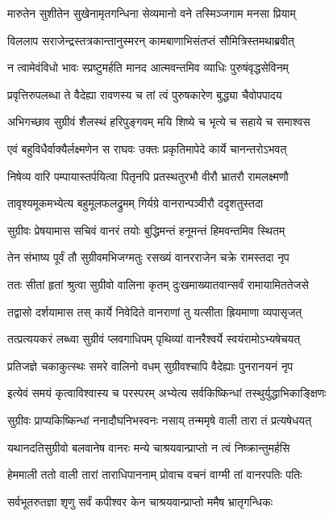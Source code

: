 \twolineshloka
{मारुतेन सुशीतेन सुखेनामृतगन्धिना}
{सेव्यमानो वने तस्मिञ्जगाम मनसा प्रियाम्}


\twolineshloka
{विललाप सराजेन्द्रस्तत्रकान्तानुस्मरन्}
{कामबाणाभिसंतप्तं सौमित्रिस्तमथाब्रवीत्}


\twolineshloka
{न त्वामेवंविधो भावः स्प्रष्टुमर्हति मानद}
{आत्मवन्तमिव व्याधिः पुरुषंवृद्धसेविनम्}


\twolineshloka
{प्रवृत्तिरुपलब्धा ते वैदेह्या रावणस्य च}
{तां त्वं पुरुषकारेण बुद्ध्या चैवोपपादय}


\twolineshloka
{अभिगच्छाव सुग्रीवं शैलस्थं हरिपुङ्गवम्}
{मयि शिष्ये च भृत्ये च सहाये च समाश्वस}


\twolineshloka
{एवं बहुविधैर्वाक्यैर्लक्ष्मणेन स राघवः}
{उक्तः प्रकृतिमापेदे कार्ये चानन्तरोऽभवत्}


\twolineshloka
{निषेव्य वारि पम्पायास्तर्पयित्वा पितृनपि}
{प्रतस्थतुरभौ वीरौ भ्रातरौ रामलक्ष्मणौ}


\twolineshloka
{तावृश्यमूकमभ्येत्य बहुमूलफलद्रुमम्}
{गिर्यग्रे वानरान्पञ्वीरौ ददृशतुस्तदा}


\twolineshloka
{सुग्रीवः प्रेषयामास सचिवं वानरं तयोः}
{बुद्धिमन्तं हनूमन्तं हिमवन्तमिव स्थितम्}


\twolineshloka
{तेन संभाष्य पूर्वं तौ सुग्रीवमभिजग्मतुः}
{रसख्यं वानरराजेन चक्रे रामस्तदा नृप}


\twolineshloka
{ततः सीतां हृतां श्रुत्वा सुग्रीवो वालिना कृतम्}
{दुःखमाख्यातवान्सर्वं रामायामिततेजसे}


\twolineshloka
{तद्वासो दर्शयामास तस् कार्ये निवेदिते}
{वानराणां तु यत्सीता ह्रियमाणा व्यपासृजत्}


\twolineshloka
{तत्प्रत्ययकरं लब्ध्वा सुग्रीवं प्लवगाधिपम्}
{पृथिव्यां वानरैश्वर्ये स्वयंरामोऽभ्यषेचयत्}


\twolineshloka
{प्रतिजज्ञे चकाकुत्स्थः समरे वालिनो वधम्}
{सुग्रीवश्चापि वैदेह्याः पुनरानयनं नृप}


\twolineshloka
{इत्येवं समयं कृत्वाविश्वास्य च परस्परम्}
{अभ्येत्य सर्वकिष्किन्धां तस्थुर्युद्धाभिकाङ्क्षिणः}


\twolineshloka
{सुग्रीवः प्राप्यकिष्किन्धां ननादौघनिभस्वनः}
{नसाय् तन्ममृषे वाली तारा तं प्रत्यषेधयत्}


\twolineshloka
{यथानदतिसुग्रीवो बलवानेष वानरः}
{मन्ये चाश्रयवान्प्राप्तो न त्वं निष्क्रान्तुमर्हसि}


\twolineshloka
{हेममाली ततो वाली तारां ताराधिपाननाम्}
{प्रोवाच वचनं वाग्मी तां वानरपतिः पतिः}


\twolineshloka
{सर्वभूतरुतज्ञा शृणु सर्वं कपीश्वर}
{केन चाश्रयवान्प्राप्तो ममैष भ्रातृगन्धिकः}

